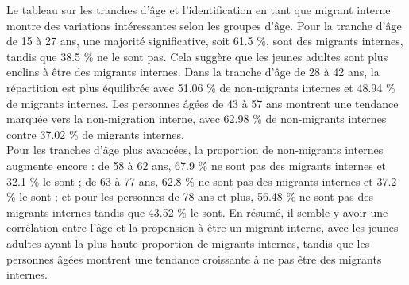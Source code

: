 \documentclass[a4paper,12pt]{article}
\begin{document}
\newpage



Le tableau sur les tranches d'âge et l'identification en tant que migrant interne montre des variations intéressantes selon les groupes d'âge.
Pour la tranche d'âge de 15 à 27 ans, une majorité significative, soit 61.5 \%, sont des migrants internes, tandis que 38.5 \% ne le sont pas. Cela suggère que les jeunes adultes sont plus enclins à être des migrants internes.
Dans la tranche d'âge de 28 à 42 ans, la répartition est plus équilibrée avec 51.06 \% de non-migrants internes et 48.94 \% de migrants internes.
Les personnes âgées de 43 à 57 ans montrent une tendance marquée vers la non-migration interne, avec 62.98 \% de non-migrants internes contre 37.02 \% de migrants internes. \\


Pour les tranches d'âge plus avancées, la proportion de non-migrants internes augmente encore : de 58 à 62 ans, 67.9 \% ne sont pas des migrants internes et 32.1 \% le sont ; de 63 à 77 ans, 62.8 \% ne sont pas des migrants internes et 37.2 \% le sont ; et pour les personnes de 78 ans et plus, 56.48 \% ne sont pas des migrants internes tandis que 43.52 \% le sont.
En résumé, il semble y avoir une corrélation entre l'âge et la propension à être un migrant interne, avec les jeunes adultes ayant la plus haute proportion de migrants internes, tandis que les personnes âgées montrent une tendance croissante à ne pas être des migrants internes.\\
\end{document}
